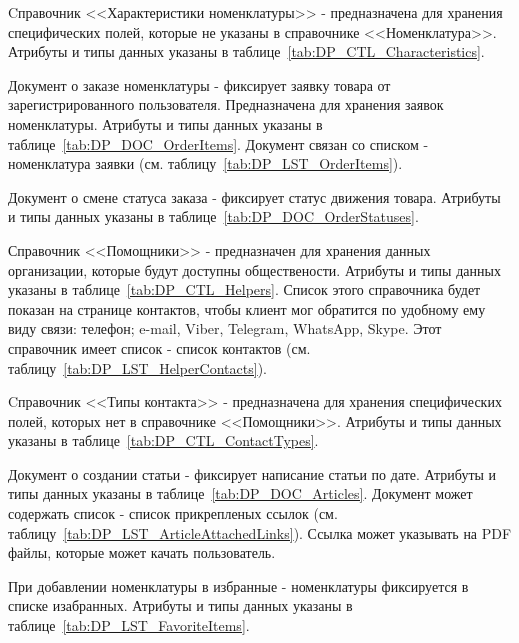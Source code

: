 Cправочник <<Характеристики номенклатуры>> - предназначена для хранения специфических полей, которые не указаны в справочнике <<Номенклатура>>.
Атрибуты и типы данных указаны в таблице~\ref{tab:DP_CTL_Characteristics}.

Документ о заказе номенклатуры - фиксирует заявку товара от зарегистрированного пользователя.
Предназначена для хранения заявок номенклатуры.
Атрибуты и типы данных указаны в таблице~\ref{tab:DP_DOC_OrderItems}.
Документ связан со списком - номенклатура заявки (см. таблицу~\ref{tab:DP_LST_OrderItems}).

Документ о смене статуса заказа - фиксирует статус движения товара.
Атрибуты и типы данных указаны в таблице~\ref{tab:DP_DOC_OrderStatuses}.

Справочник <<Помощники>> - предназначен для хранения данных организации, которые будут доступны обществености.
Атрибуты и типы данных указаны в таблице~\ref{tab:DP_CTL_Helpers}.
Список этого справочника будет показан на странице контактов,
чтобы клиент мог обратится по удобному ему виду связи:
телефон; e-mail, Viber, Telegram, WhatsApp, Skype.
Этот справочник имеет список - список контактов (см. таблицу~\ref{tab:DP_LST_HelperContacts}).

Cправочник <<Типы контакта>> - предназначена для хранения специфических полей, которых нет в справочнике <<Помощники>>.
Атрибуты и типы данных указаны в таблице~\ref{tab:DP_CTL_ContactTypes}.

Документ о создании статьи - фиксирует написание статьи по дате.
Атрибуты и типы данных указаны в таблице~\ref{tab:DP_DOC_Articles}.
Документ может содержать список - список прикрепленых ссылок (см. таблицу~\ref{tab:DP_LST_ArticleAttachedLinks}).
Ссылка может указывать на PDF файлы, которые может качать пользователь.

При добавлении номенклатуры в избранные - номенклатуры фиксируется в списке изабранных.
Атрибуты и типы данных указаны в таблице~\ref{tab:DP_LST_FavoriteItems}.

